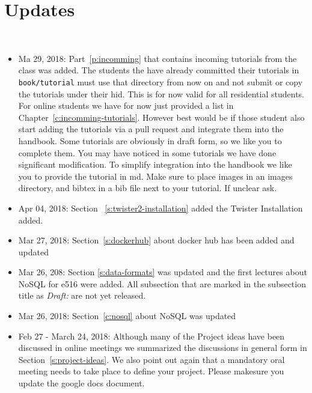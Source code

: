 
\chapter{Updates}
\FILENAME\


\begin{itemize}

\item Ma 29, 2018: Part~\ref{p:incomming} that contains incoming
  tutorials from the class was added. The students the have already
  committed their tutorials in \verb|book/tutorial| must use that
  directory from now on and not submit or copy the tutorials under
  their hid. This is for now valid for all residential students.  For
  online students we have for now just provided a list in
  Chapter~\ref{c:incomming-tutorials}. However best would be if those
  student also start adding the tutorials via a pull request and
  integrate them into the handbook. Some tutorials are obviously in
  draft form, so we like you to complete them. You may have noticed in
  some tutorials we have done significant modification. To simplify
  integration into the handbook we like you to provide the tutorial in
  md. Make sure to place images in an images directory, and bibtex in
  a bib file next to your tutorial. If unclear ask.

\item Apr 04, 2018: Section ~\ref{s:twister2-installation} added the Twister Installation added. 

\item Mar 27, 2018: Section~\ref{s:dockerhub} about docker hub has
  been added and updated

\item Mar 26, 208: Section \ref{s:data-formats} was updated and the
  first lectures about NoSQL for e516 were added. All subsection that
  are marked in the subsection title as \emph{Draft:} are not yet released.

\item Mar 26, 2018: Section~\ref{c:nosql} about NoSQL was updated

\item Feb 27 - March 24, 2018: Although many of the Project ideas have been discussed
  in online meetings we summarized the discussions in general form in
  Section~\ref{s:project-ideas}. 
  We also point out again that a mandatory oral meeting needs to take
  place to define your project. Please makesure you update the google
  docs document.


\end{itemize}
